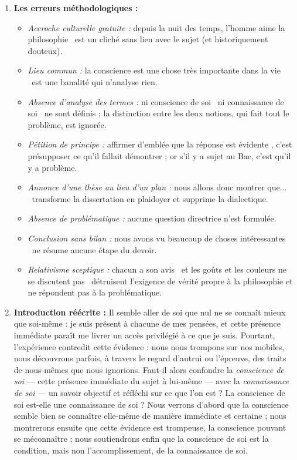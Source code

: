 \documentclass[11pt]{article}
\begin{document}
\begin{corrige}
\begin{enumerate}
\item \textbf{Les erreurs méthodologiques :}
\begin{itemize}
\item \emph{Accroche culturelle gratuite :} \guillemotleft depuis la nuit des temps, l'homme aime la philosophie \guillemotright\ est un cliché sans lien avec le sujet (et historiquement douteux).
\item \emph{Lieu commun :} \guillemotleft la conscience est une chose très importante dans la vie \guillemotright\ est une banalité qui n'analyse rien.
\item \emph{Absence d'analyse des termes :} ni \guillemotleft conscience de soi \guillemotright\ ni \guillemotleft connaissance de soi \guillemotright\ ne sont définis ; la distinction entre les deux notions, qui fait tout le problème, est ignorée.
\item \emph{Pétition de principe :} affirmer d'emblée que la réponse est \guillemotleft évidente \guillemotright, c'est présupposer ce qu'il fallait démontrer ; or s'il y a sujet au Bac, c'est qu'il y a problème.
\item \emph{Annonce d'une thèse au lieu d'un plan :} \guillemotleft nous allons donc montrer que... \guillemotright\ transforme la dissertation en plaidoyer et supprime la dialectique.
\item \emph{Absence de problématique :} aucune question directrice n'est formulée.
\item \emph{Conclusion sans bilan :} \guillemotleft nous avons vu beaucoup de choses intéressantes \guillemotright\ ne résume aucune étape du devoir.
\item \emph{Relativisme sceptique :} \guillemotleft chacun a son avis \guillemotright\ et \guillemotleft les goûts et les couleurs ne se discutent pas \guillemotright\ détruisent l'exigence de vérité propre à la philosophie et ne répondent pas à la problématique.
\end{itemize}
\item \textbf{Introduction réécrite :} Il semble aller de soi que nul ne se connaît mieux que soi-même : je suis présent à chacune de mes pensées, et cette présence immédiate paraît me livrer un accès privilégié à ce que je suis. Pourtant, l'expérience contredit cette évidence : nous nous trompons sur nos mobiles, nous découvrons parfois, à travers le regard d'autrui ou l'épreuve, des traits de nous-mêmes que nous ignorions. Faut-il alors confondre la \emph{conscience de soi} --- cette présence immédiate du sujet à lui-même --- avec la \emph{connaissance de soi} --- un savoir objectif et réfléchi sur ce que l'on est ? La conscience de soi est-elle une connaissance de soi ? Nous verrons d'abord que la conscience semble bien se connaître elle-même de manière immédiate et certaine ; nous montrerons ensuite que cette évidence est trompeuse, la conscience pouvant se méconnaître ; nous soutiendrons enfin que la conscience de soi est la condition, mais non l'accomplissement, de la connaissance de soi.


\end{enumerate}
\end{corrige}
\end{document}
